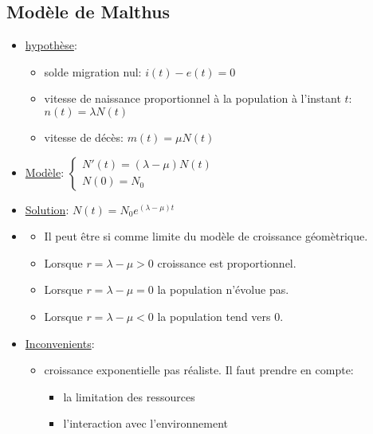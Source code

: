 \subsection{Modèle de Malthus}
\begin{itemize}
    \item \underline{hypothèse}: 
        \begin{itemize}
            \item solde migration nul: $i(t) - e(t) = 0$
            \item vitesse de naissance proportionnel à la population à l'instant  $t$:  $n(t) = \lambda N(t)$
            \item vitesse de décès: $m(t) = \mu N(t)$
        \end{itemize}
    \item \underline{Modèle}: $\begin{cases}
        N'(t) = (\lambda - \mu)N(t)\\
        N(0) = N_0
    \end{cases}$
\item \underline{Solution}: $N(t) = N_0e^{(\lambda - \mu)t}$
\item 
    \begin{property}
       \begin{itemize}
           \item Il peut être si comme limite du modèle de croissance géomètrique.
           \item Lorsque $r = \lambda - \mu > 0$ croissance est proportionnel.
           \item Lorsque  $r = \lambda - \mu = 0$ la population n'évolue pas.
           \item Lorsque  $r = \lambda - \mu < 0$ la population tend vers 0.
       \end{itemize} 
    \end{property}
\item \underline{Inconvenients}:
    \begin{itemize}
        \item croissance exponentielle pas réaliste. Il faut prendre en compte:
            \begin{itemize}
                \item la limitation des ressources
                \item l'interaction avec l'environnement
            \end{itemize}
    \end{itemize}
\end{itemize}
